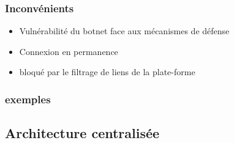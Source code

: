 \subsubsection{Inconvénients}
\begin{itemize}
	\item Vulnérabilité du botnet face aux mécanismes de défense
	\item Connexion en permanence
	\item bloqué par le filtrage de liens de la plate-forme
\end{itemize}



\subsubsection{exemples}








\subsection[Architecture  centralisée]{Architecture  centralisée}



%	

